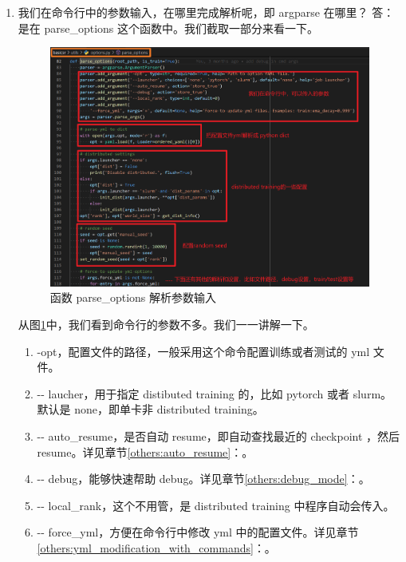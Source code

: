 \documentclass[../main.tex]{subfiles}
\begin{document}
\begin{enumerate}
    \item 我们在命令行中的参数输入，在哪里完成解析呢，即 argparse 在哪里？
          答：是在 parse\_options 这个函数中。我们截取一部分来看一下。

          \begin{figure}[ht]
              \begin{center}
                  \vspace{-0.2cm}
                  \includegraphics[width=0.9\linewidth]{figures/getting_start_parse_options.png}
                  \vspace{-0.3cm}
                  \caption{函数 parse\_options 解析参数输入}
                  \label{fig:getting_start_parse_options}
              \end{center}
              \vspace{-0.5cm}
          \end{figure}

          从图\ref{fig:getting_start_parse_options}中，我们看到命令行的参数不多。我们一一讲解一下。

          \begin{enumerate}
              \item {-}opt，配置文件的路径，一般采用这个命令配置训练或者测试的 yml 文件。
              \item {-}{-} laucher，用于指定 distibuted training 的，比如 pytorch 或者 slurm。默认是 none，即单卡非 distributed training。
              \item {-}{-} auto\_resume，是否自动 resume，即自动查找最近的 checkpoint ，然后 resume。详见章节\ref{others:auto_resume}：。
              \item {-}{-} debug，能够快速帮助 debug。详见章节\ref{others:debug_mode}：。
              \item {-}{-} local\_rank，这个不用管，是 distributed training 中程序自动会传入。
              \item {-}{-} force\_yml，方便在命令行中修改 yml 中的配置文件。详见章节\ref{others:yml_modification_with_commands}：。
          \end{enumerate}



\end{enumerate}
\end{document}
